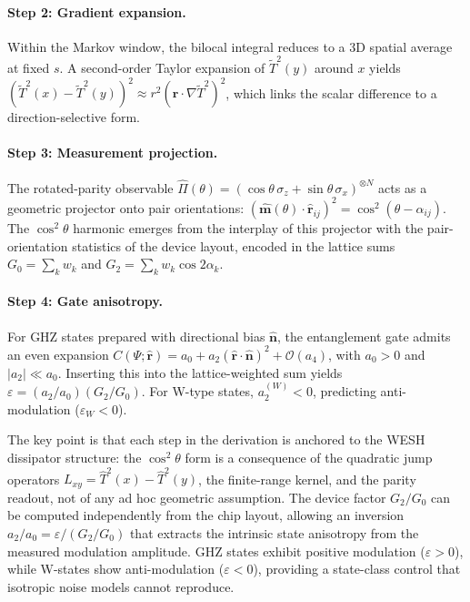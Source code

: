\documentclass[12pt,a4paper]{article}
\numberwithin{equation}{section}
\begin{document}
\paragraph{Step 2: Gradient expansion.}
Within the Markov window, the bilocal integral reduces to a 3D spatial average at fixed $s$. A second-order Taylor expansion of $\tilde{T}^2(y)$ around $x$ yields $(\tilde{T}^2(x)-\tilde{T}^2(y))^2 \approx r^2(\hat{\mathbf r}\cdot\nabla\tilde{T}^2)^2$, which links the scalar difference to a direction-selective form.

\paragraph{Step 3: Measurement projection.}
The rotated-parity observable $\hat\Pi(\theta) = (\cos\theta\,\sigma_z + \sin\theta\,\sigma_x)^{\otimes N}$ acts as a geometric projector onto pair orientations: $(\hat{\mathbf m}(\theta)\cdot\hat{\mathbf r}_{ij})^2 = \cos^2(\theta - \alpha_{ij})$. The $\cos^2\theta$ harmonic emerges from the interplay of this projector with the pair-orientation statistics of the device layout, encoded in the lattice sums $G_0 = \sum_k w_k$ and $G_2 = \sum_k w_k\cos 2\alpha_k$.

\paragraph{Step 4: Gate anisotropy.}
For GHZ states prepared with directional bias $\hat{\mathbf n}$, the entanglement gate admits an even expansion $C(\Psi;\hat{\mathbf r}) = a_0 + a_2(\hat{\mathbf r}\cdot\hat{\mathbf n})^2 + \mathcal{O}(a_4)$, with $a_0 > 0$ and $|a_2|\ll a_0$. Inserting this into the lattice-weighted sum yields $\varepsilon = (a_2/a_0)(G_2/G_0)$. For W-type states, $a_2^{(W)} < 0$, predicting anti-modulation ($\varepsilon_W < 0$).

\medskip
\noindent The key point is that each step in the derivation is anchored to the WESH dissipator structure: the $\cos^2\theta$ form is a consequence of the quadratic jump operators $L_{xy} = \hat{T}^2(x) - \hat{T}^2(y)$, the finite-range kernel, and the parity readout, not of any ad hoc geometric assumption. The device factor $G_2/G_0$ can be computed independently from the chip layout, allowing an inversion $a_2/a_0 = \varepsilon/(G_2/G_0)$ that extracts the intrinsic state anisotropy from the measured modulation amplitude. GHZ states exhibit positive modulation ($\varepsilon > 0$), while W-states show anti-modulation ($\varepsilon < 0$), providing a state-class control that isotropic noise models cannot reproduce.
\end{document}
